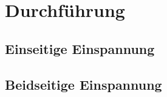 \section{Durchführung}
\label{sec:Durchführung}

\subsection{Einseitige Einspannung}
\label{sec:einseiteEinspannung}

\subsection{Beidseitige Einspannung}
\label{sec:beidseitigeEinspannung}